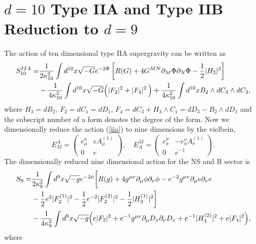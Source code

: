\documentclass[a4paper,12pt]{article}
\begin{document}
\section{$d=10$ Type IIA and Type IIB Reduction to $d=9$}

The action of ten dimensional type IIA supergravity can be
written as
\begin{equation}
\label{iia}
\begin{split}
S^{IIA}_{10}=&{1\over 2\kappa^2_{10}}\int d^{10}x \sqrt{-G}
e^{-2\Phi}\left[R(G)+4 G^{MN}\partial_M \Phi
\partial_N \Phi -{1\over 2}
|H_3|^2\right]\\
&-{1\over 4\kappa^2_{10}}\int d^{10}x \sqrt{-G}
\Bigl(|F_2|^2+|F_4|^2\,\Bigr)+{1\over 4\kappa^2_{10}}\int d^{10}x
B_2\wedge dC_3\wedge dC_3,
\end{split}
\end{equation}
where $H_3=dB_2$, $F_2=dC_1=dD_1$,
$F_4=dC_3+H_3\wedge C_1=dD_3-B_2\wedge d D_1$
and the subscript number of a form
denotes the degree of the form.
Now we dimensionally reduce the action (\ref{iia})
to nine dimensions by the vielbein,
\begin{equation}
E^A_M=\begin{pmatrix}
e^a_\mu & e A^{(1)}_\mu\\
0 & e
\end{pmatrix},
\quad
E^M_A=\begin{pmatrix}
e_a^\mu & -e^\nu_aA^{(1)}_\nu\\
0 & e^{-1}
\end{pmatrix}.
\end{equation}
The dimensionally reduced nine dimensional 
action for the NS and R sector is
\begin{equation}
\begin{split}
\label{9sugr}
S_9=&{1\over 2\kappa^2_9}\int d^9x \sqrt{-g}
e^{-2\phi}\biggl[R(g)+4g^{\mu\nu}\partial_\mu \phi\partial_\nu \phi
-e^{-2}g^{\mu\nu}\partial_\mu e\partial_\nu e\\
&-{1\over 2}e^2|F^{(1)}_2|^2
-{1\over 2}e^{-2}|F^{(2)}_2|^2
-{1\over 2}|H_3^{(1)}|^2\biggr]\\
&-{1\over 4\kappa^2_9}\int d^9 x \sqrt{-g}
\Bigl(e|F_2|^2+e^{-1}g^{\mu\nu}\partial_\mu D_x\partial_\nu D_x
+e^{-1}|H^{(2)}_3|^2+e|F_4|^2\Bigr),
\end{split}
\end{equation}
where
\end{document}
